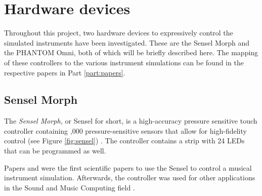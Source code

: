 




\section{Hardware devices}
Throughout this project, two hardware devices to expressively control the simulated instruments have been investigated. These are the Sensel Morph and the PHANTOM Omni, both of which will be briefly described here. The mapping of these controllers to the various instrument simulations can be found in the respective papers in Part \ref{part:papers}. 

\subsection{Sensel Morph}\label{sec:sensel}
The \textit{Sensel Morph,} or Sensel for short, is a high-accuracy pressure sensitive touch controller containing ,000 pressure-sensitive sensors that allow for high-fidelity control (see Figure \ref{fig:sensel}) \cite{sensel}. The controller contains a strip with 24 LEDs that can be programmed as well.

Papers \citeP[A] and \citeP[B] were the first scientific papers to use the Sensel to control a musical instrument simulation. Afterwards, the controller was used for other applications in the Sound and Music Computing field \cite{Paisa2019,Pardue2020,vanWalstijn2021}. 

